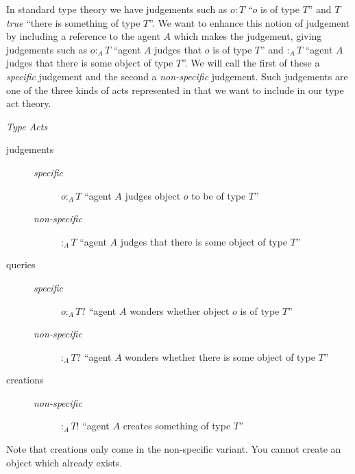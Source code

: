 In standard type theory we have judgements such as $o:T$ ``$o$ is of type $T$'' 
and 
$T$ \textit{true} ``there is something of type $T$''.    We want to
enhance this notion of judgement by including a reference to the agent
$A$ which makes the judgement, giving judgements such as
$o:_AT$ ``agent $A$ judges that $o$ is of type $T$''
and 
$:_AT$ ``agent $A$ judges that there is some object of type $T$''. We will call
the first of these a \textit{specific} judgement and the second a
\textit{non-specific} judgement.  Such
judgements are one of the three kinds of acts represented in \nexteg{}
that we want to include
in our type act theory.
\begin{ex} 
\textit{Type Acts}
\begin{description}
\item[judgements] \mbox{}

\begin{description}
\item[\textit{specific}] $o:_A T$ ``agent $A$ judges object $o$ to be of type
  $T$''

\item[\textit{non-specific}] $:_A T$ ``agent $A$ judges that there is some
  object of type $T$''
\end{description}

\item[queries] \mbox{}
\begin{description}
\item[\textit{specific}] $o:_A T?$ ``agent $A$ wonders whether object $o$ is of type
  $T$''

\item[\textit{non-specific}] $:_A T?$ ``agent $A$ wonders whether there is some object of type
$T$''
\end{description}
\item[creations] \mbox{}
\begin{description}
\item[\textit{non-specific}] $:_A T!$ ``agent $A$ creates something of type
  $T$''
\end{description}
\end{description}

\end{ex} 
Note that creations only come in the non-specific variant.  You cannot
create an object which already exists.  

